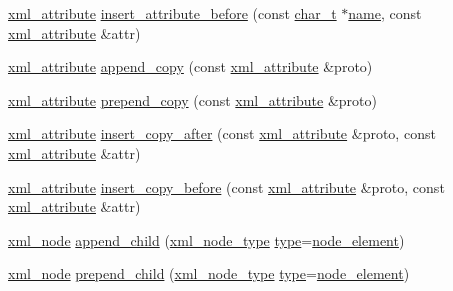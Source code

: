 \begin{DoxyCompactItemize}
\item 
\hyperlink{classpugi_1_1xml__attribute}{xml\-\_\-attribute} \hyperlink{classpugi_1_1xml__node_a742898bc2342d943a4c49916ac3a64b8}{insert\-\_\-attribute\-\_\-before} (const \hyperlink{namespacepugi_aef5a7a62cba0507542220ea15afe39df}{char\-\_\-t} $\ast$\hyperlink{classpugi_1_1xml__node_ac765caace42ecf252d90aea81e09df57}{name}, const \hyperlink{classpugi_1_1xml__attribute}{xml\-\_\-attribute} \&attr)
\item 
\hyperlink{classpugi_1_1xml__attribute}{xml\-\_\-attribute} \hyperlink{classpugi_1_1xml__node_a4c151e6665c6bfa614fe80d177fd5396}{append\-\_\-copy} (const \hyperlink{classpugi_1_1xml__attribute}{xml\-\_\-attribute} \&proto)
\item 
\hyperlink{classpugi_1_1xml__attribute}{xml\-\_\-attribute} \hyperlink{classpugi_1_1xml__node_abd0f80e4d5bc938a27b50d37a0c7865b}{prepend\-\_\-copy} (const \hyperlink{classpugi_1_1xml__attribute}{xml\-\_\-attribute} \&proto)
\item 
\hyperlink{classpugi_1_1xml__attribute}{xml\-\_\-attribute} \hyperlink{classpugi_1_1xml__node_ab5fd2ccada30141544b12c6ef554d8f4}{insert\-\_\-copy\-\_\-after} (const \hyperlink{classpugi_1_1xml__attribute}{xml\-\_\-attribute} \&proto, const \hyperlink{classpugi_1_1xml__attribute}{xml\-\_\-attribute} \&attr)
\item 
\hyperlink{classpugi_1_1xml__attribute}{xml\-\_\-attribute} \hyperlink{classpugi_1_1xml__node_ac81f8aded4b53a9b8c98d131986cb535}{insert\-\_\-copy\-\_\-before} (const \hyperlink{classpugi_1_1xml__attribute}{xml\-\_\-attribute} \&proto, const \hyperlink{classpugi_1_1xml__attribute}{xml\-\_\-attribute} \&attr)
\item 
\hyperlink{classpugi_1_1xml__node}{xml\-\_\-node} \hyperlink{classpugi_1_1xml__node_a190f4851bb4bc4bb61c89fffb663a9af}{append\-\_\-child} (\hyperlink{namespacepugi_a137e94a038e4ab0ada6477cf7f6153a9}{xml\-\_\-node\-\_\-type} \hyperlink{classpugi_1_1xml__node_ab881e8c41edc84bf7507591d1ad8ead4}{type}=\hyperlink{namespacepugi_a137e94a038e4ab0ada6477cf7f6153a9a6d223e3a0d8ce8e4ee6f4a2697b8bcd1}{node\-\_\-element})
\item 
\hyperlink{classpugi_1_1xml__node}{xml\-\_\-node} \hyperlink{classpugi_1_1xml__node_a9e0a6dddfe1fefc74bb2b7689376989c}{prepend\-\_\-child} (\hyperlink{namespacepugi_a137e94a038e4ab0ada6477cf7f6153a9}{xml\-\_\-node\-\_\-type} \hyperlink{classpugi_1_1xml__node_ab881e8c41edc84bf7507591d1ad8ead4}{type}=\hyperlink{namespacepugi_a137e94a038e4ab0ada6477cf7f6153a9a6d223e3a0d8ce8e4ee6f4a2697b8bcd1}{node\-\_\-element})

\end{DoxyCompactItemize}
